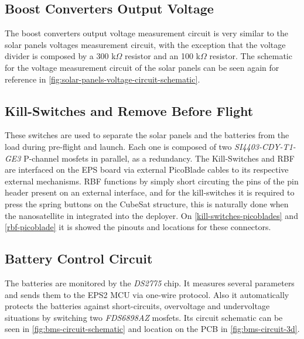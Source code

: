 \subsection{Boost Converters Output Voltage}

The boost converters output voltage measurement circuit is very similar to the solar panels voltages measurement circuit, with the exception that the voltage divider is composed by a 300 k$\Omega$ resistor and an 100 k$\Omega$ resistor.
The schematic for the voltage measurement circuit of the solar panels can be seen again for reference in \autoref{fig:solar-panels-voltage-circuit-schematic}.

\subsection{Kill-Switches and Remove Before Flight}

These switches are used to separate the solar panels and the batteries from the load during pre-flight and launch. Each one is composed of two \textit{SI4403-CDY-T1-GE3} P-channel mosfets in parallel, as a redundancy.
The Kill-Switches and RBF are interfaced on the EPS board via external PicoBlade cables to its respective external mechanisms. RBF functions by simply short circuting the pins of the pin header present on an external interface\cite{iip}, and for the kill-switches it is required to press the spring buttons on the CubeSat structure, this is naturally done when the nanosatellite in integrated into the deployer.
On \autoref{kill-switches-picoblades} and \autoref{rbf-picoblade} it is showed the pinouts and locations for these connectors.

\subsection{Battery Control Circuit}

The batteries are monitored by the \textit{DS2775} chip. It measures several parameters and sends them to the EPS2 MCU via one-wire protocol. Also it automatically protects the batteries against short-circuits, overvoltage and undervoltage situations by switching two \textit{FDS6898AZ} mosfets.
Its circuit schematic can be seen in \autoref{fig:bms-circuit-schematic} and location on the PCB in \autoref{fig:bms-circuit-3d}.

